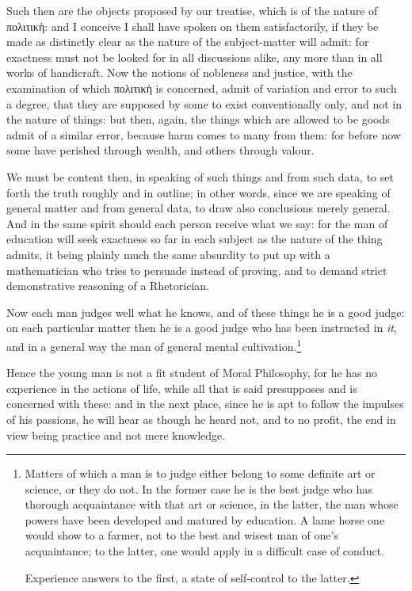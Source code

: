Such then are the objects proposed by our treatise, which is of the nature of
πολιτικὴ: and I conceive I shall have
spoken on them satisfactorily, if they be made as distinctly clear as the
nature of the subject-matter will admit: for exactness must not be looked for
in all discussions alike, any more than in all works of handicraft. Now the
notions of nobleness and justice, with the examination of which
πολιτικὴ is concerned, admit of
variation and error to such a degree, that they are supposed by some to exist
conventionally only, and not in the nature of things: but then, again, the
things which are allowed to be goods admit of a similar error, because harm
comes to many from them: for before now some have perished through wealth, and
others through valour.

We must be content then, in speaking of such things and from such data, to set
forth the truth roughly and in outline; in other words, since we are speaking
of general matter and from general data, to draw also conclusions merely
general. And in the same spirit should each person receive what we say: for the
man of education will seek exactness so far in each subject as the nature of
the thing admits, it being plainly much the same absurdity to put up with a
mathematician who tries to persuade instead of proving, and to demand strict
demonstrative reasoning of a Rhetorician.

Now each man judges well what he knows, and of these things he is a good judge:
on each particular matter then he is a good judge who has been instructed in
\emph{it}, and in a general way the man of general mental
cultivation.\footnote{Matters of which a man is to judge either belong to some definite art
or science, or they do not. In the former case he is the best judge who
has thorough acquaintance with that art or science, in the latter, the
man whose powers have been developed and matured by education. A lame
horse one would show to a farmer, not to the best and wisest man of
one’s acquaintance; to the latter, one would apply in a difficult
case of conduct.

Experience answers to the first, a state of self-control to the latter.}

Hence the young man is not a fit student of Moral Philosophy, for he has no
experience in the actions of life, while all that is said presupposes and is
concerned with these: and in the next place, since he is apt to follow the
impulses of his passions, he will hear as though he heard not, and to no
profit, the end in view being practice and not mere knowledge.

